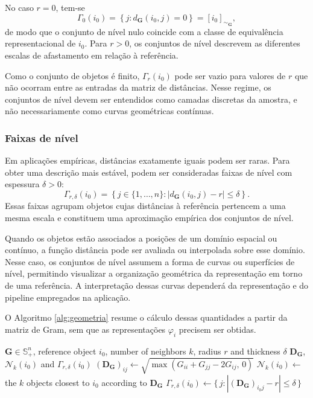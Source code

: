 No caso $r=0$, tem-se
\begin{equation}
    \Gamma_0(i_0)
    =
    \left\{
        j:
        d_{\mathbf{G}}(i_0,j)=0
    \right\}
    =
    [i_0]_{\sim_{\mathbf{G}}},
\end{equation}
de modo que o conjunto de nível nulo coincide com a classe de equivalência
representacional de $i_0$. Para $r>0$, os conjuntos de nível descrevem as
diferentes escalas de afastamento em relação à referência.

Como o conjunto de objetos é finito, $\Gamma_r(i_0)$ pode ser vazio para
valores de $r$ que não ocorram entre as entradas da matriz de distâncias.
Nesse regime, os conjuntos de nível devem ser entendidos como camadas
discretas da amostra, e não necessariamente como curvas geométricas
contínuas.

\subsubsection*{Faixas de nível}

Em aplicações empíricas, distâncias exatamente iguais podem ser raras. Para
obter uma descrição mais estável, podem ser consideradas faixas de nível
com espessura $\delta>0$:
\begin{equation}\label{eq:sample_level_band}
    \Gamma_{r,\delta}(i_0)
    =
    \left\{
        j\in\{1,\dots,n\}
        :
        \left|
            d_{\mathbf{G}}(i_0,j)-r
        \right|
        \leq\delta
    \right\}.
\end{equation}
Essas faixas agrupam objetos cujas distâncias à referência pertencem a uma
mesma escala e constituem uma aproximação empírica dos conjuntos de nível.

Quando os objetos estão associados a posições de um domínio espacial ou
contínuo, a função distância pode ser avaliada ou interpolada sobre esse
domínio. Nesse caso, os conjuntos de nível assumem a forma de curvas ou
superfícies de nível, permitindo visualizar a organização geométrica da
representação em torno de uma referência. A interpretação dessas curvas
dependerá da representação e do pipeline empregados na aplicação.

O Algoritmo \ref{alg:geometria} resume o cálculo dessas quantidades a partir
da matriz de Gram, sem que as representações $\varphi_i$ precisem ser obtidas.

\begin{algorithm}[htbp]
\caption{Relative geometry induced by the Gram matrix}
\label{alg:geometria}
\begin{algorithmic}[1]
\Require $\mathbf{G} \in \mathbb{S}_+^n$, reference object $i_0$, number of neighbors $k$, radius $r$ and thickness $\delta$
\Ensure $\mathbf{D}_{\mathbf{G}}$, $\mathcal{N}_k(i_0)$ and $\Gamma_{r,\delta}(i_0)$
    \State $(\mathbf{D}_{\mathbf{G}})_{ij} \gets \sqrt{\max\left(G_{ii} + G_{jj} - 2G_{ij},\, 0\right)}$ 
\EndFor
\State $\mathcal{N}_k(i_0) \gets$ the $k$ objects closest to $i_0$ according to $\mathbf{D}_{\mathbf{G}}$
\State $\Gamma_{r,\delta}(i_0) \gets \{\, j : |(\mathbf{D}_{\mathbf{G}})_{i_0 j} - r| \leq \delta \,\}$
\end{algorithmic}
\end{algorithm}
